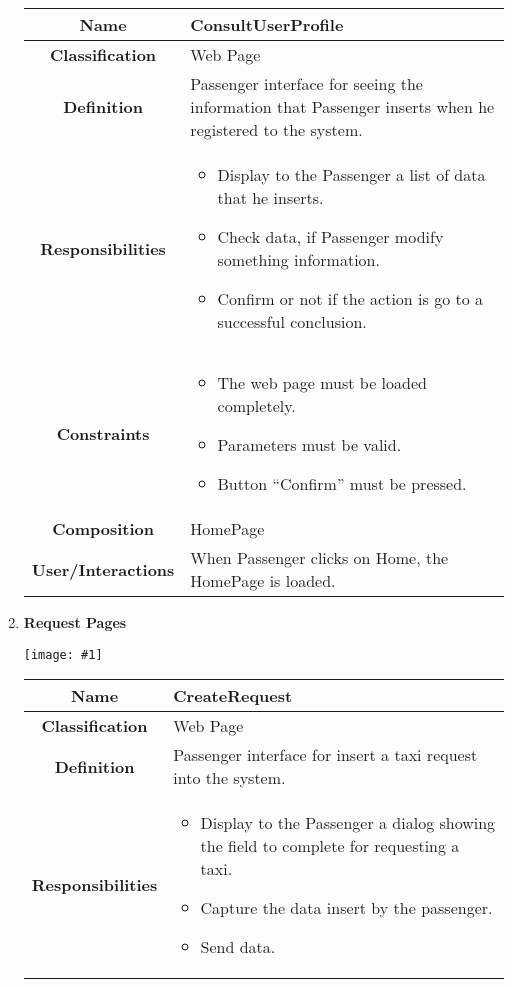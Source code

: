 \documentclass[11pt, a4paper,titlepage]{article}
\newcommand{\image}[1]{
	\begin{center}
		\noindent \texttt{[image: \#1]}
	\end{center}
	}
\begin{document}
\begin{enumerate}
\begin{tabularx}{\textwidth}{| c | X |}
	\hline
	\textbf{Name} & 
	ConsultUserProfile
	\\
	\hline
	\textbf{Classification} & 
	Web Page
	\\
	\hline
	\textbf{Definition} & 
	Passenger interface for seeing the information that Passenger inserts when he registered to the system.
	\\
	\hline
	\textbf{Responsibilities} &
	\begin{itemize}
		\item Display to the Passenger a list of data that he inserts.
		\item Check data, if Passenger modify something information.
		\item Confirm or not if the action is go to a successful conclusion.
	\end{itemize}
	\\
	\hline
	\textbf{Constraints} & 
	\begin{itemize}
		\item The web page must be loaded completely.
		\item Parameters must be valid.
		\item Button “Confirm” must be pressed.
	\end{itemize}
	\\
	\hline
	\textbf{Composition} & 
	HomePage
	\\
	\hline
	\textbf{User/Interactions} & 
     When Passenger clicks on Home, the HomePage is loaded.    
	\\
	\hline	
\end{tabularx}	
\newpage
\item \textbf{Request Pages}\\
\image{page_request.png}
\begin{tabularx}{\textwidth}{| c | X |}
	\hline
	\textbf{Name} & 
	CreateRequest
	\\
	\hline
	\textbf{Classification} & 
	Web Page
	\\
	\hline
	\textbf{Definition} & 
	Passenger interface for insert a taxi request into the system.\\
	\hline
	\textbf{Responsibilities} &
	\begin{itemize}
		\item Display to the Passenger a dialog showing the field to complete for requesting a taxi.
		\item Capture the data insert by the passenger.
		\item Send data.

\end{itemize}
\end{tabularx}
\end{enumerate}
\end{document}

